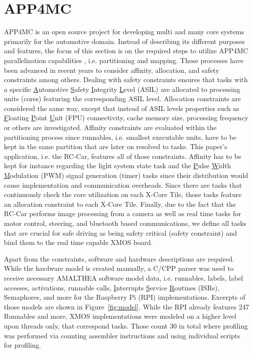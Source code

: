 \documentclass [a4paper,final,conference,10pt]{IDAACS}
\begin{document}
\section{APP4MC}
\label{sec:app4mc}
APP4MC is an open source project for developing multi and many core systems primarily for the automotive domain. Instead of describing its different purposes and features, the focus of this section is on the required steps to utilize APP4MC parallelization capabilities \cite{ICPDSSE}, i.e. partitioning and mapping. Those processes have been advanced in recent years to consider affinity, allocation, and safety constraints among others. Dealing with safety constraints ensures that tasks with a specific \underline{A}utomotive \underline{S}afety \underline{I}ntegrity \underline{L}evel (ASIL) are allocated to processing units (cores) featuring the corresponding ASIL level. Allocation constraints are considered the same way, except that instead of ASIL levels properties such as \underline{F}loating \underline{P}oint \underline{U}nit (FPU) connectivity, cache memory size, processing frequency or others are investigated. Affinity constraints are evaluated within the partitioning process since runnables, i.e. smallest executable units, have to be kept in the same partition that are later on resolved to tasks. This paper's application, i.e. the RC-Car, features all of those constraints. Affinity has to be kept for instance regarding the light system state task and the \underline{P}ulse \underline{W}idth \underline{M}odulation (PWM) signal generation (timer) tasks since their distribution would cause implementation and communication overheads. Since there are tasks that continuously check the core utilization on each X-Core Tile, those tasks feature an allocation constraint to each X-Core Tile. Finally, due to the fact that the RC-Car performs image processing from a camera as well as real time tasks for motor control, steering, and bluetooth based communications, we define all tasks that are crucial for safe driving as being safety critical (safety constraint) and bind them to the real time capable XMOS board. 

Apart from the constraints, software and hardware descriptions are required. While the hardware model is created manually, a C/CPP parser was used to receive necessary AMALTHEA software model data, i.e. runnables, labels, label accesses, activations, runnable calls, \underline{I}nterrupts \underline{S}ervice \underline{R}outines (ISRs), Semaphores, and more for the Raspberry Pi (RPI) implementations. Excerpts of those models are shown in Figure~\ref{fig:model}. While the RPI already features 247 Runnables and more, XMOS implementations were modeled on a higher level upon threads only, that correspond tasks. Those count 30 in total where profiling was performed via counting assembler instructions and using individual scripts for profiling.
\end{document}
